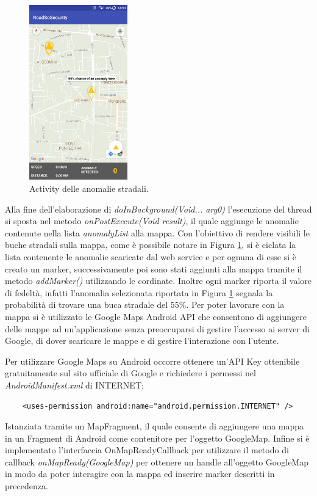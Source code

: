 \documentclass[a4paper, 11pt]{article} %
\begin{document}
\begin{figure} %
	\begin{center}
		\includegraphics[width=0.38\textwidth]{images/anomalyActivity.jpg}
	\end{center}
	\caption{Activity delle anomalie stradali.}
	\label{fig:activityAnomaly}
\end{figure}

Alla fine dell'elaborazione di \textit{doInBackground(Void... arg0)} l'esecuzione del thread si sposta nel metodo \textit{onPostExecute(Void result)}, il quale aggiunge le anomalie contenute nella lista \textit{anomalyList} alla mappa. Con l'obiettivo di rendere visibili le buche stradali sulla mappa, come è possibile notare in Figura \ref{fig:activityAnomaly}, si è ciclata la lista contenente le anomalie scaricate dal web service e per ognuna di esse si è creato un marker, successivamente poi sono stati aggiunti alla mappa tramite il metodo \textit{addMarker()} utilizzando le cordinate. Inoltre ogni marker riporta il valore di fedeltà, infatti l'anomalia selezionata riportata in Figura \ref{fig:activityAnomaly} segnala la probabilità di trovare una buca stradale del $55\%$. 
Per poter lavorare con la mappa si è utilizzato le Google Maps Android API che consentono di aggiungere delle mappe ad un’applicazione senza preoccuparsi di gestire l’accesso ai server di Google, di dover scaricare le mappe e di gestire l’interazione con l’utente. 

Per utilizzare Google Maps su Android occorre ottenere un’API Key ottenibile gratuitamente sul sito ufficiale di Google e richiedere i permessi nel \textit{AndroidManifest.xml} di INTERNET; 
\begin{verbatim}
	<uses-permission android:name="android.permission.INTERNET" />
\end{verbatim}
Istanziata tramite un MapFragment, il quale consente di aggiungere una mappa in un Fragment di Android come contenitore per l’oggetto GoogleMap. Infine si è implementato l’interfaccia OnMapReadyCallback per utilizzare il metodo di callback \textit{onMapReady(GoogleMap)} per ottenere un handle all’oggetto GoogleMap in modo da poter interagire con la mappa ed inserire marker descritti in precedenza.
\end{document}
